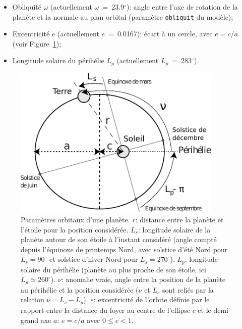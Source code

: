 \documentclass[a4paper,12pt]{article}
\begin{document}
\begin{itemize}
\item Obliquité $\omega$ (actuellement $\omega$~=~23.9$^\circ$): angle entre
l'axe de rotation de la planète et la normale au plan orbital (paramètre
\texttt{obliquit} du modèle);
\item Excentricité $e$ (actuellement $e$~=~0.0167): écart à un cercle, avec
$e=c/a$ (voir Figure~\ref{fig-orbite});
\item Longitude solaire du périhélie $L_p$ (actuellement $L_p$~=~283$^\circ$).
\end{itemize}

\begin{figure}[htbp]
\centering
\includegraphics[width=10cm]{fig-3T054-excentricite-nu.pdf}
\caption{Paramètres orbitaux d'une planète. $r$: distance entre la planète et
l'étoile pour la position considérée. $L_s$: longitude solaire de la planète
autour de son étoile à l'instant considéré (angle compté depuis l'équinoxe de
printemps Nord, avec solstice d'été Nord pour $L_s=90^\circ$ et solstice
d'hiver Nord pour $L_s=270^\circ$). $L_p$: longitude solaire du périhélie
(planète au plus proche de son étoile, ici $L_p \simeq 260^\circ$). $\nu$:
anomalie vraie, angle entre la position de la planète au périhélie et la
position considérée ($\nu$ et $L_s$ sont reliés par la relation $\nu = L_s -
L_p$). $e$: excentricité de l'orbite définie par le rapport entre la distance
du foyer au centre de l'ellipse $c$ et le demi grand axe $a$: $e=c/a$ avec $0
\leq e < 1$.}
\label{fig-orbite}
\end{figure}
\end{document}
